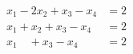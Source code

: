 \begin{align*}
x_1 - 2x_2 + x_3 - x_4 &= 2\\
x_1 + x_2 + x_3 - x_4 &= 2\\
x_1 \quad + x_3 - x_4 &= 2
\end{align*}